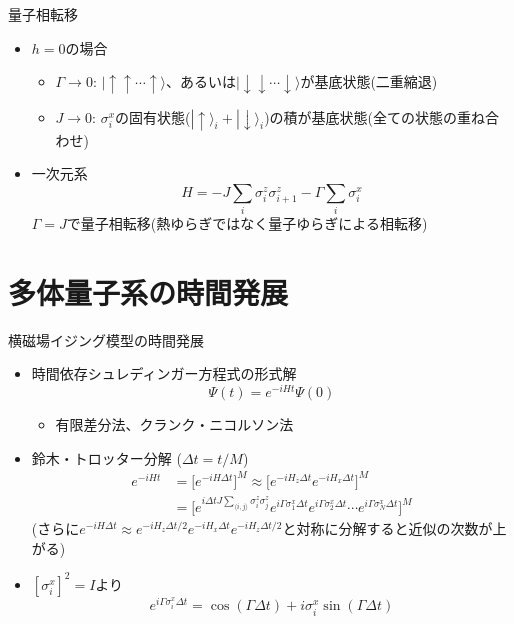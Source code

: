 \begin{frame}[t,fragile]{量子相転移}
  \begin{itemize}
  \item $h=0$の場合
    \begin{itemize}
    \item $\Gamma \rightarrow 0$: $|\!\uparrow\uparrow\cdots\uparrow\rangle$、あるいは$|\!\downarrow\downarrow\cdots\downarrow\rangle$が基底状態(二重縮退)
    \item $J \rightarrow 0$: $\sigma_i^x$の固有状態($|\!\uparrow\rangle_i + |\!\downarrow\rangle_i$)の積が基底状態(全ての状態の重ね合わせ)
    \end{itemize}
  \item 一次元系
    \[
      H = - J \sum_{i} \sigma_i^z \sigma_{i+1}^z - \Gamma \sum_i \sigma_i^x
    \]
    $\Gamma = J$で量子相転移(熱ゆらぎではなく量子ゆらぎによる相転移)  
  \end{itemize}
\end{frame}

\section{多体量子系の時間発展}

\begin{frame}[t,fragile]{横磁場イジング模型の時間発展}
  \begin{itemize}
  \item 時間依存シュレディンガー方程式の形式解
    \[
    \Psi(t) = e^{-iHt} \Psi(0)
    \]
    \begin{itemize}
    \item 有限差分法、クランク・ニコルソン法
    \end{itemize}
  \item 鈴木・トロッター分解 ($\Delta t = t / M$)
    \begin{align*}
      e^{-iHt} &= \big[ e^{-iH\Delta t} \big]^M \approx \big[ e^{-iH_z\Delta t} e^{-iH_x\Delta t} \big]^M \\
      &= \big[ e^{i\Delta t J \sum_{\langle i,j \rangle} \sigma_i^z \sigma_j^z} e^{i\Gamma \sigma_1^x\Delta t} e^{i\Gamma \sigma_2^x\Delta t} \cdots e^{i\Gamma \sigma_N^x\Delta t} \big]^M
    \end{align*}
    (さらに$e^{-iH\Delta t} \approx e^{-iH_z\Delta t/2} e^{-iH_x\Delta t} e^{-iH_z\Delta t/2}$と対称に分解すると近似の次数が上がる)
  \item $[\sigma_i^x]^2 = I$より
    \[
    e^{i\Gamma \sigma_i^x\Delta t} = \cos (\Gamma\Delta t) + i \sigma_i^x \sin (\Gamma\Delta t)
    \]
  \end{itemize}
\end{frame}

